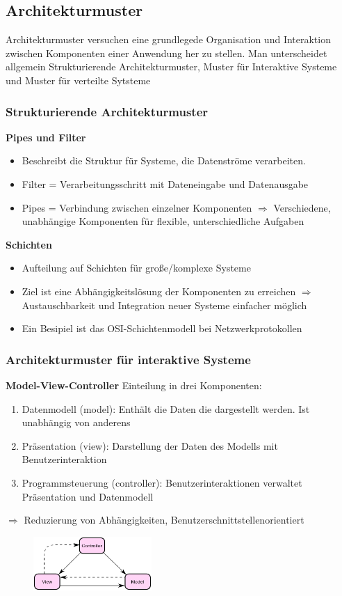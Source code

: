 \documentclass[a4paper,10pt]{scrartcl}
\begin{document}
\subsection{Architekturmuster}
Architekturmuster versuchen eine grundlegede Organisation und Interaktion zwischen Komponenten einer Anwendung her zu stellen. Man unterscheidet allgemein Strukturierende Architekturmuster, Muster für Interaktive Systeme und Muster für verteilte Sytsteme

\subsubsection{Strukturierende Architekturmuster}
\textbf{Pipes und Filter}
\begin{itemize}
    \item Beschreibt die Struktur für Systeme, die Datenströme verarbeiten.
    \item Filter = Verarbeitungsschritt mit Dateneingabe und Datenausgabe
    \item Pipes = Verbindung zwischen einzelner Komponenten \newline
    $\Rightarrow$ Verschiedene, unabhängige Komponenten für flexible, unterschiedliche Aufgaben
\end{itemize}
\textbf{Schichten}
\begin{itemize}
    \item Aufteilung auf Schichten für große/komplexe Systeme 
    \item Ziel ist eine Abhängigkeitslösung der Komponenten zu erreichen\newline
    $\Rightarrow$ Austauschbarkeit und Integration neuer Systeme einfacher möglich
    \item Ein Besipiel ist das OSI-Schichtenmodell bei Netzwerkprotokollen
\end{itemize}
\subsubsection{Architekturmuster für interaktive Systeme}
\textbf{Model-View-Controller}\newline
Einteilung in drei Komponenten:
\begin{enumerate}
    \item Datenmodell (model): Enthält die Daten die dargestellt werden. Ist unabhängig von anderens
    \item Präsentation (view): Darstellung der Daten des Modells mit Benutzerinteraktion
    \item Programmsteuerung (controller): Benutzerinteraktionen verwaltet Präsentation und Datenmodell
\end{enumerate}
$\Rightarrow$ Reduzierung von Abhängigkeiten, Benutzerschnittstellenorientiert  \newline
\begin{figure}[h]
	\centering
	\includegraphics[width = 4.5cm]{ModelViewControllerDiagram2}
\end{figure}
\newpage
\end{document}
